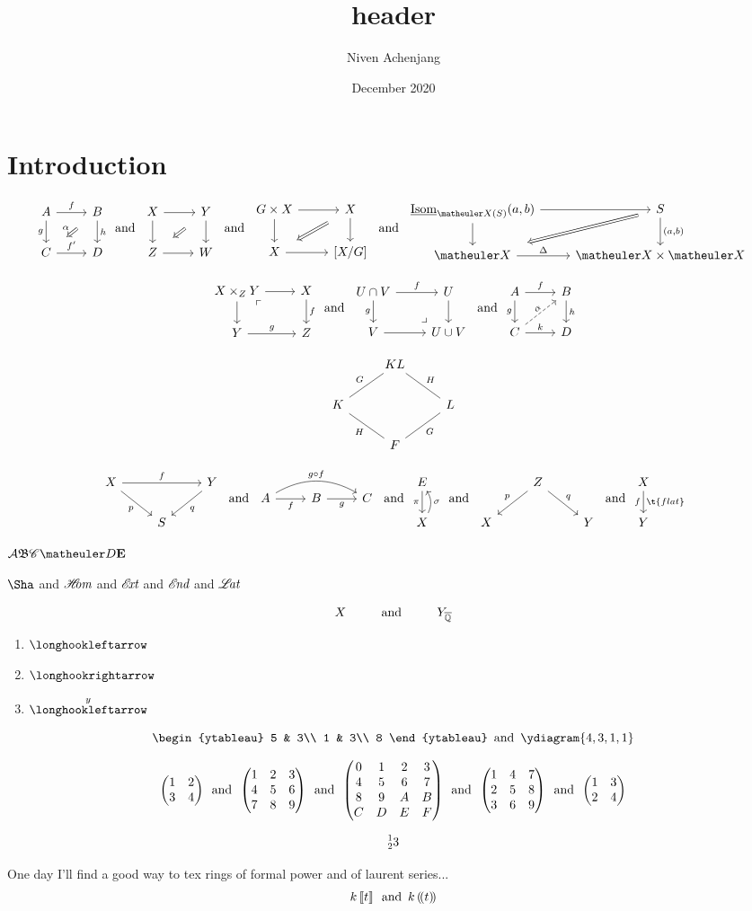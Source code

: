 \documentclass{article}
\title{header}
\author{Niven Achenjang}
\date{December 2020}
\numberwithin{thm}{section}
\numberwithin{prob}{section}
\numberwithin{equation}{section}
\begin{document}
\maketitle

\section{Introduction}

$$\twocommsquare AfBghC{f'}D\alpha\tand\baretwocommsquare XYZW\tand\baretwocommsquare{G\by X}XX{[X/G]}\tand\twocommsquare{\ul\Isom_{\meX(S)}(a,b)}{}S{}{(a,b)}\meX\Delta{\meX\by\meX}{}$$

$$\pullback {X\by_ZY}XfYgZ\tand\pushout {U\cap V}fUgV{U\cup V}\tand\liftsquare AfBghCkD\alpha$$

$$\galoisdiamond{KL}GHKLHGF$$

$$\mapover XfYpqS\tand\compdiag AfBgC{g\circ f}\tand\mapwithsect E\pi X\sigma\tand\correspondence ZpqXY\tand\mapdown Xf{\t{flat}}Y$$

$\mcA\mf B\msC\meD\mbf E$

$\Sha$ and $\sHom$ and $\sExt$ and $\sEnd$ and $\sLat$

$$X\Text{and}\sspacing Y_\Qbar$$

\begin{enumerate}
    \item  $\fintoo$
    \item  $\intoo$
    \item $\xfintoo{y}$
\end{enumerate}
$$\begin{ytableau}
    5 & 3\\
    1 & 3\\
    8
\end{ytableau}\tand\ydiagram{4,3,1,1}$$

$$\mat1234\tand\Mat123456789\tand\MAT0123456789ABCDEF\tand\Matt123456789\tand\matt1234$$

$$\prescript123$$

One day I'll find a good way to tex rings of formal power and of laurent series...
$$k\dsq t\tand k\dparens t$$
\end{document}
